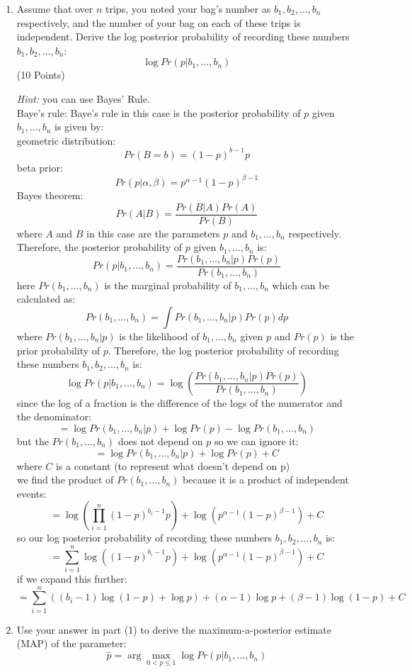 \documentclass[a3paper,12pt]{article} %
\begin{document}
\begin{enumerate}
    \item Assume that over \( n \) trips, you noted your bag’s number as \( b_1, b_2, \ldots, b_n \) respectively, and the number of your bag on each of these trips is independent. Derive the log posterior probability of recording these numbers \( b_1, b_2, \ldots, b_n \):
    \[
    \log Pr(p|b_1, \ldots, b_n)
    \]
    (10 Points)

    \textit{Hint:} you can use Bayes' Rule.
    \\ Baye's rule:
    Baye's rule in this case is the posterior probability of \( p \) given \( b_1, \ldots, b_n \) is given by:
    \\ geometric distribution:
    \[
    Pr(B = b) = (1 - p)^{b-1} p
    \]
    beta prior:
    \[
    Pr(p|\alpha, \beta) = p^{\alpha - 1} (1 - p)^{\beta - 1}
    \]
    Bayes theorem:
    \[
    Pr(A|B) = \frac{Pr(B|A)Pr(A)}{Pr(B)}
    \]
    where \( A \) and \( B \) in this case are the parameters \( p \) and \( b_1, \ldots, b_n \) respectively. Therefore, the posterior probability of \( p \) given \( b_1, \ldots, b_n \) is:
    \[
    Pr(p|b_1, \ldots, b_n) = \frac{Pr(b_1, \ldots, b_n|p)Pr(p)}{Pr(b_1, \ldots, b_n)}
    \]
    here \( Pr(b_1, \ldots, b_n) \) is the marginal probability of \( b_1, \ldots, b_n \) which can be calculated as:
    \[
    Pr(b_1, \ldots, b_n) = \int Pr(b_1, \ldots, b_n|p)Pr(p) dp
    \]
    where \( Pr(b_1, \ldots, b_n|p) \) is the likelihood of \( b_1, \ldots, b_n \) given \( p \) and \( Pr(p) \) is the prior probability of \( p \). Therefore, the log posterior probability of recording these numbers \( b_1, b_2, \ldots, b_n \) is:
    \[
    \log Pr(p|b_1, \ldots, b_n) = \log \left( \frac{Pr(b_1, \ldots, b_n|p)Pr(p)}{Pr(b_1, \ldots, b_n)} \right)
    \]
    since the log of a fraction is the difference of the logs of the numerator and the denominator:
    \[
    = \log Pr(b_1, \ldots, b_n|p) + \log Pr(p) - \log Pr(b_1, \ldots, b_n)
    \]
    but the \(Pr(b_1, \ldots, b_n)\) does not depend on \(p\) so we can ignore it:
    \[
        = \log Pr(b_1, \ldots, b_n|p) + \log Pr(p) + C
    \]
        where \( C \) is a constant (to represent what doesn't depend on p)
        \\ we find the product of \(Pr(b_1, \ldots, b_n)\) because it is a product of independent events:
    \[
            = \log \left( \prod_{i=1}^n (1 - p)^{b_i - 1} p \right) + \log \left( p^{\alpha - 1} (1 - p)^{\beta - 1} \right) + C
    \]
    so our log posterior probability of recording these numbers \( b_1, b_2, \ldots, b_n \) is:
    \[
    = \sum_{i=1}^n \log \left( (1 - p)^{b_i - 1} p \right) + \log \left( p^{\alpha - 1} (1 - p)^{\beta - 1} \right) + C
    \]
    if we expand this further:
    \[
    = \sum_{i=1}^n \left( (b_i - 1) \log (1 - p) + \log p \right) + (\alpha - 1) \log p + (\beta - 1) \log (1 - p) + C
    \]
    \item Use your answer in part (1) to derive the maximum-a-posterior estimate (MAP) of the parameter:
    \[
    \hat{p} = \arg\max_{0 < p \leq 1} \log Pr(p|b_1, \ldots, b_n)
    \]
    

\end{enumerate}
\end{document}
